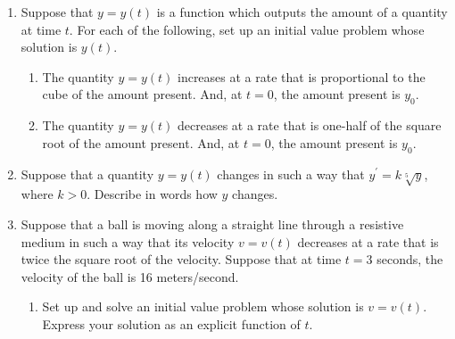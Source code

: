\documentclass[12pt]{article}
\newif\ifans
\begin{document}
\begin{enumerate}

\item Suppose that $y=y(t)$ is a function which outputs the amount of a quantity at time $t$. For each of the following, set up an initial value problem whose solution is $y(t)$.

\begin{enumerate}

\item The quantity $y=y(t)$ increases at a rate that is proportional to the cube of the amount present.  And, at $t=0$, the amount present is $y_0$.  

\ifans{\fbox{$\left\{\begin{array}{l}
\frac{dy}{dt}=ky^3\\
\\
y(0)=y_0
\end{array}\right.$, where $k$ is a positive constant.}} \fi

\item The quantity $y=y(t)$ decreases at a rate that is one-half of the square root of the amount present.  And, at $t=0$, the amount present is $y_0$.

\ifans{\fbox{$\left\{\begin{array}{l}
\frac{dy}{dt}=-\frac{1}{2}\sqrt{y}\\
\\
y(0)=y_0
\end{array}\right.$}} \fi

\end{enumerate}

\item Suppose that a quantity $y=y(t)$ changes in such a way that $y^{\prime}=k\sqrt[5]{y}$, where $k>0$.  Describe in words how $y$ changes.

\ifans{\fbox{The quantity increases at a rate proportional to the fifth-root of the amount present.}} \fi

\item Suppose that a ball is moving along a straight line through a resistive medium in such a way that its velocity $v=v(t)$ decreases at a rate that is twice the square root of the velocity.  Suppose that at time $t=3$ seconds, the velocity of the ball is 16 meters/second.

\begin{enumerate}

\item Set up and solve an initial value problem whose solution is $v=v(t)$.  Express your solution as an explicit function of $t$.


\end{enumerate}
\end{enumerate}
\end{document}

